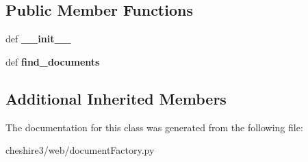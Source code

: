 \subsection*{Public Member Functions}
\begin{DoxyCompactItemize}
\item 
\hypertarget{classcheshire3_1_1web_1_1document_factory_1_1_http_document_stream_aef82d97b10ea10ab3d00c883e81ea759}{def {\bfseries \-\_\-\-\_\-init\-\_\-\-\_\-}}\label{classcheshire3_1_1web_1_1document_factory_1_1_http_document_stream_aef82d97b10ea10ab3d00c883e81ea759}

\item 
\hypertarget{classcheshire3_1_1web_1_1document_factory_1_1_http_document_stream_a551fde44099143abc2ce905d6190c0a6}{def {\bfseries find\-\_\-documents}}\label{classcheshire3_1_1web_1_1document_factory_1_1_http_document_stream_a551fde44099143abc2ce905d6190c0a6}

\end{DoxyCompactItemize}
\subsection*{Additional Inherited Members}


The documentation for this class was generated from the following file\-:\begin{DoxyCompactItemize}
\item 
cheshire3/web/document\-Factory.\-py\end{DoxyCompactItemize}

